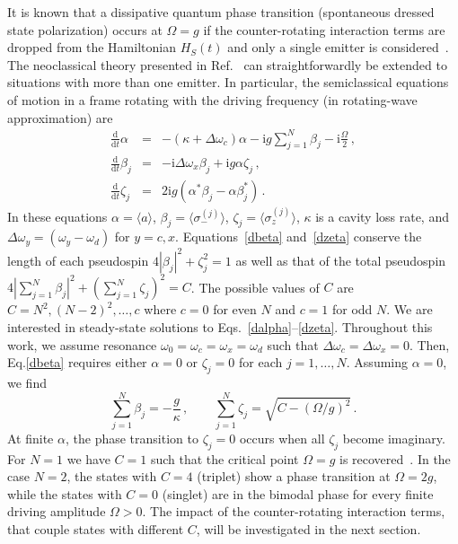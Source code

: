 \documentclass[aps,pra,twocolumn,showpacs,showkeys,10pt,nofootinbib]{revtex4-1}
\newcommand{\rmi}{\mathrm i}
\newcommand{\rmd}{\mathrm d}
\begin{document}
It is known that a dissipative quantum phase transition (spontaneous dressed state polarization) occurs at $\Omega = g$ if the counter-rotating interaction terms are dropped from the Hamiltonian $H_S(t)$ and only a single emitter is considered~\cite{sc88, ac91, agc92, car15}.
The neoclassical theory presented in Ref.~\cite{car15} can straightforwardly be extended to situations with more than one emitter.
In particular, the semiclassical equations of motion in a frame rotating with the driving frequency (in rotating-wave approximation) are
\begin{eqnarray}\label{dalpha}
  \frac{\rmd}{\rmd t} \alpha &=& -(\kappa + \Delta\omega_c) \alpha - \rmi g \sum_{j=1}^N  \beta_j - \rmi \frac{\Omega}{2} \,, \\\label{dbeta}
  \frac{\rmd}{\rmd t} \beta_j &=& -\rmi \Delta\omega_x \beta_j + \rmi g \alpha \zeta_j \,, \\\label{dzeta}
  \frac{\rmd}{\rmd t} \zeta_j &=& 2 \rmi g (\alpha^* \beta_j - \alpha \beta_j^*) \,.
\end{eqnarray}
In these equations $\alpha=\langle a\rangle$, $\beta_j=\langle\sigma_-^{(j)}\rangle$, $\zeta_j=\langle\sigma_z^{(j)}\rangle$, $\kappa$ is a cavity loss rate, and $\Delta\omega_y = (\omega_y-\omega_d)$ for $y=c,x$.
Equations~\eqref{dbeta} and~\eqref{dzeta} conserve the length of each pseudospin $4 |\beta_j|^2 + \zeta_j^2 = 1$ as well as that of the total pseudospin $4 |\sum_{j=1}^N\beta_j|^2 + (\sum_{j=1}^N\zeta_j)^2 = C$.
The possible values of $C$ are $C=N^2,(N-2)^2,\dots,c$ where $c=0$ for even $N$ and $c=1$ for odd $N$.
We are interested in steady-state solutions to Eqs.~\eqref{dalpha}--\eqref{dzeta}.
Throughout this work, we assume resonance $\omega_0=\omega_c=\omega_x=\omega_d$ such that $\Delta\omega_c=\Delta\omega_x=0$.
Then, Eq.\eqref{dbeta} requires either $\alpha=0$ or $\zeta_j=0$ for each $j=1,\dots,N$.
Assuming $\alpha=0$, we find
\begin{equation}
  \sum_{j=1}^N \beta_j = -\frac{g}{\kappa} \,, \qquad
  \sum_{j=1}^N \zeta_j = \sqrt{C - (\Omega / g)^2} \,.
\end{equation}
At finite $\alpha$, the phase transition to $\zeta_j=0$ occurs when all $\zeta_j$ become imaginary.
For $N=1$ we have $C=1$ such that the critical point $\Omega=g$ is recovered~\cite{sc88, ac91, agc92, car15}.
In the case $N=2$, the states with $C=4$ (triplet) show a phase transition at $\Omega=2g$, while the states with $C=0$ (singlet) are in the bimodal phase for every finite driving amplitude $\Omega>0$.
The impact of the counter-rotating interaction terms, that couple states with different $C$, will be investigated in the next section.
\end{document}
